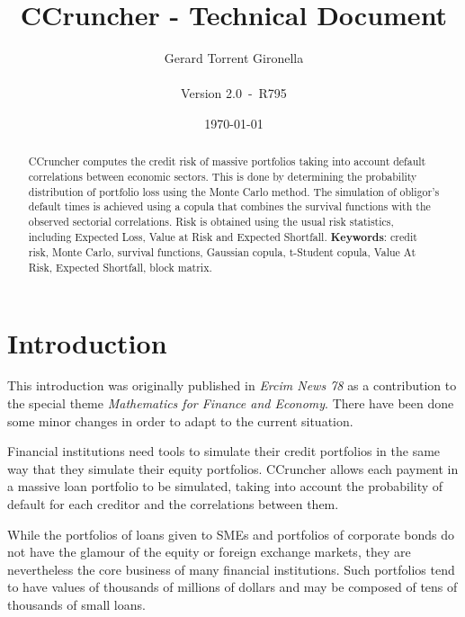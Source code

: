 \documentclass[a4paper,12pt,final]{article}
\def\numversion{2.0}
\def\svnversion{R795}
\begin{document}
\title{CCruncher - Technical Document}
\author{Gerard Torrent Gironella\\\\Version \numversion\ -\ \svnversion}
\date{\today}
\maketitle


\begin{abstract}
CCruncher computes the credit risk of massive portfolios 
taking into account default correlations between economic sectors. This is done 
by determining the probability distribution of portfolio loss using the Monte 
Carlo method. The simulation of obligor's default times is achieved
using a copula that combines the survival functions with the observed
sectorial correlations. Risk is obtained using the usual risk statistics, 
including Expected Loss, Value at Risk and Expected Shortfall.
\newline
\newline
\textbf{Keywords}: credit risk, Monte Carlo, survival functions, Gaussian copula, 
t-Student copula, Value At Risk, Expected Shortfall, block matrix.
\end{abstract}
\newpage


\tableofcontents
\newpage


\section{Introduction}

This introduction was originally published in \emph{Ercim News 78} \cite{ccruncher:ercim78}
as a contribution to the special theme \emph{Mathematics for Finance and Economy}.
There have been done some minor changes in order to adapt to the current situation.
\newline

Financial institutions need tools to simulate their credit portfolios in the same 
way that they simulate their equity portfolios. CCruncher allows each payment
in a massive loan portfolio to be simulated, taking into account the probability 
of default for each creditor and the correlations between them.
\newline

While the portfolios of loans given to SMEs and portfolios of corporate bonds do 
not have the glamour of the equity or foreign exchange markets, they are nevertheless 
the core business of many financial institutions. Such portfolios tend to have values 
of thousands of millions of dollars and may be composed of tens of thousands of small 
loans.
\newline
\end{document}
